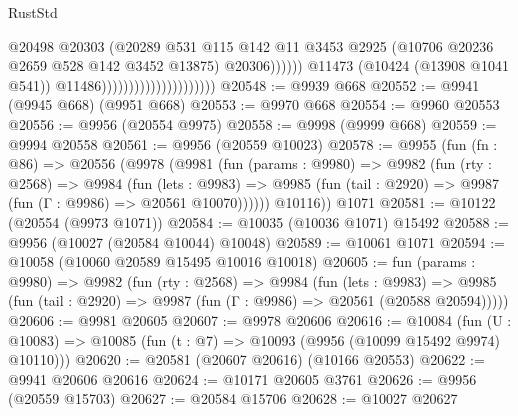\begin{lexlean}{RustStd}
\begin{coremodule}
                                                        @20498
                                                        @20303
                                                        (@20289
                                                          @531
                                                          @115
                                                          @142
                                                          @11
                                                          @3453
                                                          @2925
                                                          (@10706
                                                            @20236
                                                            @2659
                                                            @528
                                                            @142
                                                            @3452
                                                            @13875)
                                                          @20306))))))
                                              @11473
                                              (@10424 (@13908 @1041 @541))
                                              @11486)))))))))))))))))))))
@20548 := @9939 @668
@20552 := @9941 (@9945 @668) (@9951 @668)
@20553 := @9970 @668
@20554 := @9960 @20553
@20556 := @9956 (@20554 @9975)
@20558 := @9998 (@9999 @668)
@20559 := @9994 @20558
@20561 := @9956 (@20559 @10023)
@20578 := @9955
    (fun (fn : @86) =>
    @20556
      (@9978
        (@9981
          (fun (params : @9980) =>
          @9982
            (fun (rty : @2568) =>
            @9984
              (fun (lets : @9983) =>
              @9985 (fun (tail : @2920) => @9987 (fun (Γ : @9986) => @20561 @10070))))))
        @10116))
    @1071
@20581 := @10122 (@20554 (@9973 @1071))
@20584 := @10035 (@10036 @1071) @15492
@20588 := @9956 (@10027 (@20584 @10044) @10048)
@20589 := @10061 @1071
@20594 := @10058 (@10060 @20589 @15495 @10016 @10018)
@20605 := fun (params : @9980) =>
  @9982
    (fun (rty : @2568) =>
    @9984
      (fun (lets : @9983) =>
      @9985 (fun (tail : @2920) => @9987 (fun (Γ : @9986) => @20561 (@20588 @20594)))))
@20606 := @9981 @20605
@20607 := @9978 @20606
@20616 := @10084
    (fun (U : @10083) => @10085 (fun (t : @7) => @10093 (@9956 (@10099 @15492 @9974) @10110)))
@20620 := @20581 (@20607 @20616) (@10166 @20553)
@20622 := @9941 @20606 @20616
@20624 := @10171 @20605 @3761
@20626 := @9956 (@20559 @15703)
@20627 := @20584 @15706
@20628 := @10027 @20627

\end{coremodule}
\end{lexlean}
